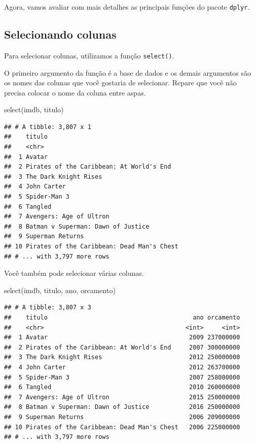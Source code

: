 \documentclass[
]{book}
\newenvironment{Shaded}{\begin{snugshade}}{\end{snugshade}}
\newcommand{\FunctionTok}[1]{\textcolor[rgb]{0.00,0.00,0.00}{#1}}
\newcommand{\NormalTok}[1]{#1}
\begin{document}
Agora, vamos avaliar com mais detalhes as principais funções do pacote \texttt{dplyr}.

\hypertarget{selecionando-colunas}{%
\subsection{Selecionando colunas}\label{selecionando-colunas}}

Para selecionar colunas, utilizamos a função \texttt{select()}.

O primeiro argumento da função é a base de dados e os demais argumentos são os nomes das colunas que você gostaria de selecionar. Repare que você não precisa colocar o nome da coluna entre aspas.

\begin{Shaded}
\begin{Highlighting}[]
\FunctionTok{select}\NormalTok{(imdb, titulo)}
\end{Highlighting}
\end{Shaded}

\begin{verbatim}
## # A tibble: 3,807 x 1
##    titulo                                     
##    <chr>                                      
##  1 Avatar                                     
##  2 Pirates of the Caribbean: At World's End   
##  3 The Dark Knight Rises                      
##  4 John Carter                                
##  5 Spider-Man 3                               
##  6 Tangled                                    
##  7 Avengers: Age of Ultron                    
##  8 Batman v Superman: Dawn of Justice         
##  9 Superman Returns                           
## 10 Pirates of the Caribbean: Dead Man's Chest 
## # ... with 3,797 more rows
\end{verbatim}

Você também pode selecionar várias colunas.

\begin{Shaded}
\begin{Highlighting}[]
\FunctionTok{select}\NormalTok{(imdb, titulo, ano, orcamento)}
\end{Highlighting}
\end{Shaded}

\begin{verbatim}
## # A tibble: 3,807 x 3
##    titulo                                        ano orcamento
##    <chr>                                       <int>     <int>
##  1 Avatar                                       2009 237000000
##  2 Pirates of the Caribbean: At World's End     2007 300000000
##  3 The Dark Knight Rises                        2012 250000000
##  4 John Carter                                  2012 263700000
##  5 Spider-Man 3                                 2007 258000000
##  6 Tangled                                      2010 260000000
##  7 Avengers: Age of Ultron                      2015 250000000
##  8 Batman v Superman: Dawn of Justice           2016 250000000
##  9 Superman Returns                             2006 209000000
## 10 Pirates of the Caribbean: Dead Man's Chest   2006 225000000
## # ... with 3,797 more rows
\end{verbatim}
\end{document}
